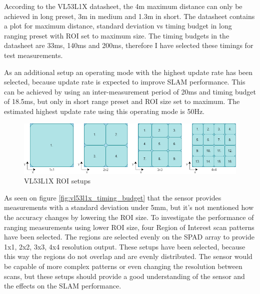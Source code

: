 According to the VL53L1X datasheet, the 4m maximum distance can only be achieved in long preset, 3m in medium 
and 1.3m in short. The datasheet contains a plot for maximum distance, standard deviation vs timing budget
in long ranging preset with ROI set to maximum size. The timing budgets in the datasheet are 33ms, 
140ms and 200ms, therefore I have selected these timings for test measurements. 

As an additional setup an operating mode with the highest update rate has been selected, because update rate is
expected to improve SLAM performance. This can be achieved by using an inter-measurement period of 20ms and 
timing budget of 18.5ms, but only in short range preset and ROI size set to maximum. The estimated highest 
update rate using this operating mode is 50Hz.

\begin{figure}[!ht]
    \centering
    \includegraphics[width=150mm, keepaspectratio]{figures/vl53l1x_spad_arrays.png}
    \caption{VL53L1X ROI setups}
    \label{fig:vl53l1x_spad_arrays}
\end{figure}

As seen on figure \ref{fig:vl53l1x_timing_budget} that the sensor provides measurements with a standard deviation
under 5mm, but it's not mentioned how the accuracy changes by lowering the ROI size. To investigate the 
performance of ranging measurements using lower ROI size, four Region of Interest scan patterns have been selected.
The regions are selected evenly on the SPAD array to provide 1x1, 2x2, 3x3, 4x4 resolution output. These setups 
have been selected, because this way the regions do not overlap and are evenly distributed. The sensor would be
capable of more complex patterns or even changing the resolution between scans, but these setups should provide 
a good understanding of the sensor and the effects on the SLAM performance.

